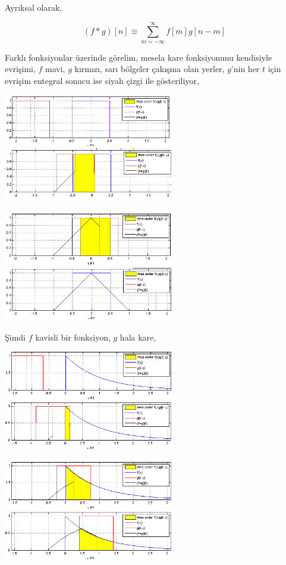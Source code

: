 \documentclass[12pt,fleqn]{article}\usepackage{../../common}
\begin{document}
Ayrıksal olarak,

$$ (f * g) [n] \equiv \sum_{m=-\infty}^{\infty} f[m] g[n-m]  $$

Farklı fonksiyonlar üzerinde görelim, mesela kare fonksiyonunu kendisiyle
evrişimi, $f$ mavi, $g$ kırmızı, sarı bölgeler çakışma olan yerler, $g$'nin
her $t$ için evrişim entegral sonucu ise siyah çizgi ile gösteriliyor,

\includegraphics[width=20em]{box1.png}
\includegraphics[width=20em]{box2.png}

\includegraphics[width=20em]{box3.png}
\includegraphics[width=20em]{box4.png}

Şimdi $f$ kavisli bir fonksiyon, $g$ hala kare,

\includegraphics[width=20em]{spiky0.png}
\includegraphics[width=20em]{spiky1.png}

\includegraphics[width=20em]{spiky2.png}
\includegraphics[width=20em]{spiky3.png}
\end{document}
